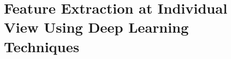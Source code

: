 
\section{Feature Extraction at Individual View Using Deep Learning Techniques} \label{sec:feature_extraction}
    
    
